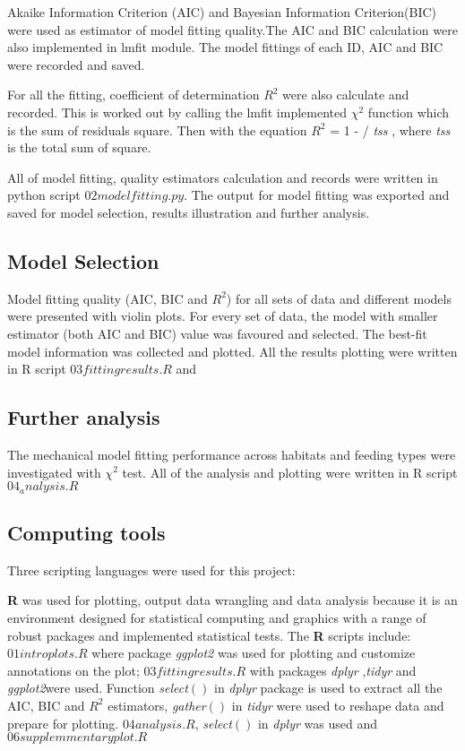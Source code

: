 \documentclass[11pt, a4paper]{article}
\begin{document}
Akaike Information Criterion (AIC) and Bayesian Information Criterion(BIC) were used as estimator of model fitting quality.The AIC and BIC calculation were also implemented in lmfit module. The model fittings of each ID, AIC and BIC were recorded and saved.

For all the fitting, coefficient of determination ${R^{2}}$ were also calculate and recorded. This is worked out by calling the lmfit implemented $\chi^{2}$ function which is the sum of residuals square. Then with the equation $R^{2}$ = 1 - / \textit{tss} , where \textit{tss} is the total sum of square.


 
All of model fitting, quality estimators calculation and records were written in python script $02 model fitting.py$. The output for model fitting was exported and saved for model selection, results illustration and further analysis. 

\subsection{Model Selection}

Model fitting quality (AIC, BIC and $R^{2}$) for all sets of data and different models were presented with violin plots. For every set of data, the model with smaller estimator (both AIC and BIC) value was favoured and selected. The best-fit model information was collected and plotted. All the results plotting were written in R script $03 fitting results.R$ and 


\subsection{Further analysis}
The mechanical model fitting performance across habitats and feeding types were investigated with $\chi^{2}$ test.  All of the analysis and plotting were written in R script $04_analysis.R$

\subsection{Computing tools}
Three scripting languages were used for this project:

 \textbf{R} \cite{R} was used for plotting, output data wrangling and data analysis because it is an environment designed for statistical computing and graphics with a range of robust packages and implemented statistical tests. 
 The \textbf{R} scripts include: $01 intro plots.R$ where package \textit{ggplot2} \cite{ggplot2} was used for plotting and customize annotations on the plot; $03 fitting results.R$ with packages \textit{dplyr} \cite{dplyr},\textit{tidyr} \cite{tidyr} and \textit{ggplot2}were used. Function \textit{select$()$} in \textit{dplyr} package is used to extract all the AIC, BIC and $R^{2}$ estimators,  \textit{gather$ () $} in \textit{tidyr} were used to reshape data and prepare for plotting.  $04 analysis.R $, \textit{select$ () $} in \textit{dplyr} was used and $ 06 supplemmentary plot.R  $
\end{document}
